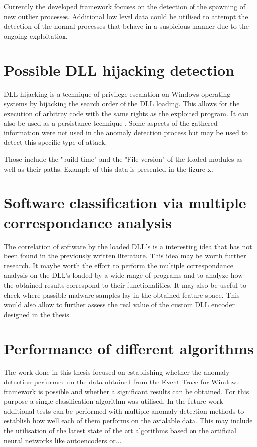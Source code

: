 \documentclass[a4paper,twoside,12pt]{book}
\begin{document}
Currently the developed framework focuses on the detection of the spawning of new outlier processes.
Additional low level data could be utilised to attempt the detection of the normal processes that behave
in a suspicious manner due to the ongoing exploitation.

\section{Possible DLL hijacking detection}

DLL hijacking is a technique of privilege escalation on Windows operating systems by hijacking the 
search order of the DLL loading. This allows for the execution of arbitray code with the same rights 
as the exploited program. It can also be used as a persistance technique \cite{bib:DLLhijacking}.
Some aspects of the gathered information were not used in the anomaly detection process but may be
used to detect this specific type of attack. 

Those include the "build time" and the "File version" of the loaded modules as well as their paths.
Example of this data is presented in the figure x.

\section{Software classification via multiple correspondance analysis}

The correlation of software by the loaded DLL's is a interesting idea that has not been
found in the previously written literature. This idea may be worth further research. It maybe worth
the effort to perform the multiple correspondance analysis on the DLL's loaded by a wide range 
of programs and to analyze how the obtained results correspond to their functionalities. It may also
be useful to check where passible malware samples lay in the obtained feature space. This would also
allow to further assess the real value of the custom DLL encoder designed in the thesis. 

\section{Performance of different algorithms}

The work done in this thesis focused on establishing whether the anomaly detection performed on the
data obtained from the Event Trace for Windows framework is possible and whether a significant results
can be obtained. For this purpose a single classification algorithm was utilised. In the future work 
additional tests can be performed with multiple anomaly detection methods to establish how well each 
of them performs on the avialable data. This may include the utilisation of the latest state of the 
art algorithms based on the artificial neural networks like autoencoders or...
\end{document}
